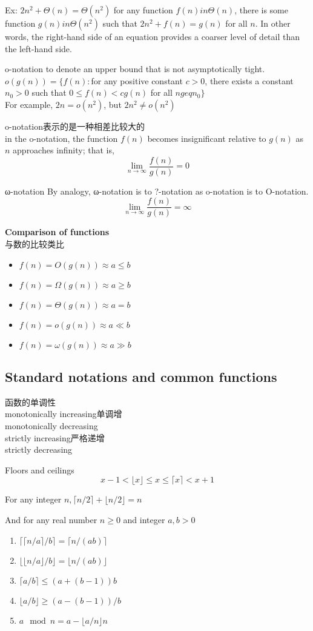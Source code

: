 \documentclass{article}
\begin{document}
Ex:
$2n^2 + \Theta(n) = \Theta(n^2)$
for any function $f(n) in \Theta(n)$, there is some function $g(n) in \Theta(n^2)$ such that $2n^2 + f(n) = g(n)$ for all $n$. In other words, the right-hand side of an equation provides a coarser level of detail than the left-hand side.

o-notation
to denote an upper bound that is not asymptotically tight.\\
$o(g(n)) = \{f(n) : $for any positive constant $c > 0$, there exists a constant $n_0 > 0$ such that $0 \leq f(n) < cg(n)$ for all $n geq n_0\}$\\
For example, $2n = o(n^2)$, but $2n^2 \neq o(n^2)$

o-notation表示的是一种相差比较大的\\
in the o-notation, the function $f(n)$ becomes insignificant relative to $g(n)$ as $n$ approaches infinity; that is,
$$\lim_{n \to \infty} \frac{f(n)}{g(n)} = 0 $$

ω-notation
By analogy, ω-notation is to ?-notation as o-notation is to O-notation.
$$ \lim_{n \to \infty} \frac{f(n)}{g(n)} = \infty $$

\textbf{Comparison of functions}\\
与数的比较类比
\begin{itemize}
	\item $f(n) = O(g(n))	\approx	a \leq b$
	\item $f(n) = \Omega(g(n))	\approx a \geq b$
	\item $f(n) = \Theta(g(n))	\approx	a = b$
	\item $f(n) = o(g(n))	\approx	a \ll b$
	\item $f(n) = \omega(g(n))	\approx	a \gg b$
\end{itemize}

\subsection{Standard notations and common functions}
函数的单调性\\
monotonically increasing单调增\\
monotonically decreasing\\
strictly increasing严格递增\\
strictly decreasing

Floors and ceilings
$$
x -1 < \lfloor x \rfloor \leq x \leq \lceil x \rceil < x + 1
$$

For any integer $n, \lceil n/2 \rceil + \lfloor n/2 \rfloor = n$

And for any real number $n \geq 0$ and integer $a,b >0$
\begin{enumerate}
	\item $\lceil \lceil n/a \rceil /b \rceil = \lceil n/(ab) \rceil$
	\item $\lfloor \lfloor n/a \rfloor /b \rfloor = \lfloor n/(ab) \rfloor$
	\item $\lceil a/b \rceil \leq (a+(b-1))b$
	\item $\lfloor a/b \rfloor \geq (a-(b-1))/b$
	\item $a \mod n = a - \lfloor a/n \rfloor n$
\end{enumerate}
\end{document}
